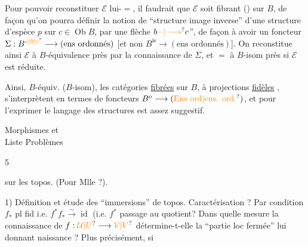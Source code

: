 Pour pouvoir reconstituer \(\mathcal E\) lui-\(=\), il faudrait que \(\mathcal E\) soit fibrant () sur \(B\), de façon qu'on pourra définir la notion de ``structure image inverse'' d'une structure d'espèce \(p\) sur \(c\in\operatorname{Ob} B\), par une flèche \(b\unsure{-|\longrightarrow}c\)'', de façon à avoir \inserted{\(=\)} un foncteur \(\Sigma:B^{\unsure{o|0|\circ}}\longrightarrow(\text{ens ordonnés})\) [et non   \(B^{\mathrm{is}}\longrightarrow(\text{ens ordonnés})\)]. On reconstitue ainsi \(\mathcal E\) à \(B\)-équivalence près par la connaissance de \(\Sigma\), et \(=\) à \(B\)-isom près si \(\mathcal E\) est réduite.

Ainsi,  \(B\)-équiv. (\(B\)-isom), les catégories \uline{fibrées} sur \(B\), à projections \uline{fidèles} , s'interprètent en termes de foncteurs  \(B^o\longrightarrow(\unsure{\text{Ens ord}|\text{ens. ord.}})\), et pour l'exprimer le langage des structures est assez suggestif.

Morphismes et \\
Liste Problèmes

5 

 sur les topos. (Pour Mlle  ?).

1) Définition et étude des ``immersions'' de topos.  Caractérisation ? Par condition \(f_*\) pl fid i.e. \(f^*f_*\xrightarrow{\sim}\operatorname{id}\) (i.e. \(f^*\) passage au quotient? Dans quelle mesure la  connaissance de \(f:\unsure{\mathcal U|U}\longrightarrow\unsure{\mathcal V|V}\) détermine-t-elle la ``partie loc fermée'' lui donnant naissance ? Plus précisément, si





